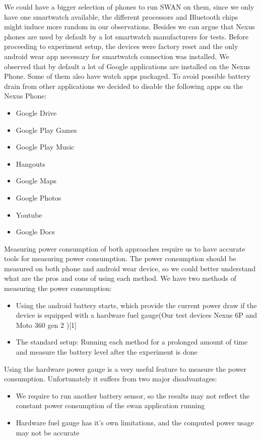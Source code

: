  We could have a bigger selection of phones to run SWAN on them, since we only have one smartwatch available,
 the different processors  and Bluetooth chips might induce more random in our observations.
 Besides we can argue that Nexus phones are used by default by a lot smartwatch manufacturers for tests.
 Before proceeding to experiment setup, the devices were factory reset and the only android wear app necessary for smartwatch connection was installed.
 We observed that by default a lot of Google applications are installed on the Nexus Phone. Some of them also have watch apps packaged.
 To avoid possible battery drain from other applications we decided to disable the following apps on the Nexus Phone:
 \begin{itemize}
  \item  Google Drive
  \item Google Play Games
  \item Google Play Music
  \item Hangouts
  \item Google Maps
  \item Google Photos
  \item Youtube
  \item Google Docs
 \end{itemize}

 Measuring power consumption of both approaches require us to have accurate tools for measuring power consumption.
 The power consumption should be measured on both phone and android wear device, so we could better understand what are the pros and cons of using each method.
 We have two methods of measuring the power consumption:
 \begin{itemize}
  \item Using the android battery starts, which provide the current power draw if the device is equipped with a hardware fuel gauge(Our test devices Nexus 6P and Moto 360 gen 2 )[1]
  \item The standard setup: Running each method for a prolonged amount of time and measure the battery level after the experiment is done
 \end{itemize}

 Using the hardware power gauge is a very useful feature to measure the power consumption. Unfortunately it suffers from two major disadvantages:
 \begin{itemize}
  \item We require to run another battery sensor, so the results may not reflect the constant power consumption of the swan application running
  \item Hardware fuel gauge has it's own limitations, and the computed power usage may not be accurate
 \end{itemize}

